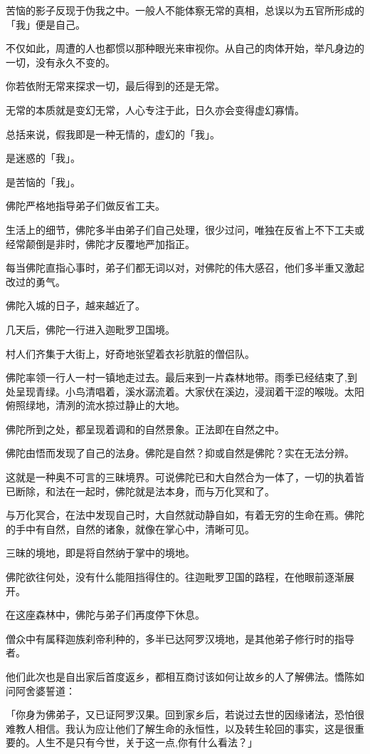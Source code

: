 \documentclass[twoside,openany]{book}
\begin{document}
苦恼的影子反现于伪我之中。一般人不能体察无常的真相，总误以为五官所形成的「我」便是自己。

不仅如此，周遭的人也都惯以那种眼光来审视你。从自己的肉体开始，举凡身边的一切，没有永久不变的。

你若依附无常来探求一切，最后得到的还是无常。

无常的本质就是变幻无常，人心专注于此，日久亦会变得虚幻寡情。

总括来说，假我即是一种无情的，虚幻的「我」。

是迷惑的「我」。

是苦恼的「我」。

佛陀严格地指导弟子们做反省工夫。

生活上的细节，佛陀多半由弟子们自己处理，很少过问，唯独在反省上不下工夫或经常颠倒是非时，佛陀才反覆地严加指正。

每当佛陀直指心事时，弟子们都无词以对，对佛陀的伟大感召，他们多半重又激起改过的勇气。

佛陀入城的日子，越来越近了。

几天后，佛陀一行进入迦毗罗卫国境。

村人们齐集于大街上，好奇地张望着衣衫肮脏的僧侣队。

佛陀率领一行人一村一镇地走过去。最后来到一片森林地带。雨季已经结束了,到处呈现青绿。小鸟清唱着，溪水潺流着。大家伏在溪边，浸润着干涩的喉咙。太阳俯照绿地，清洌的流水掠过静止的大地。

佛陀所到之处，都呈现着调和的自然景象。正法即在自然之中。

佛陀由悟而发现了自己的法身。佛陀是自然？抑或自然是佛陀？实在无法分辨。

这就是一种奥不可言的三昧境界。可说佛陀已和大自然合为一体了，一切的执着皆已断除，和法在一起时，佛陀就是法本身，而与万化冥和了。

与万化冥合，在法中发现自己时，大自然就动静自如，有着无穷的生命在焉。佛陀的手中有自然，自然的诸象，就像在掌心中，清晰可见。

三昧的境地，即是将自然纳于掌中的境地。

佛陀欲往何处，没有什么能阻挡得住的。往迦毗罗卫国的路程，在他眼前逐渐展开。

在这座森林中，佛陀与弟子们再度停下休息。

僧众中有属释迦族刹帝利种的，多半已达阿罗汉境地，是其他弟子修行时的指导者。

他们此次也是自出家后首度返乡，都相互商讨该如何让故乡的人了解佛法。憍陈如问阿舍婆誓道：

「你身为佛弟子，又已证阿罗汉果。回到家乡后，若说过去世的因缘诸法，恐怕很难教人相信。我认为应让他们了解生命的永恒性，以及转生轮回的事实，这是很重要的。人生不是只有今世，关于这一点,你有什么看法？」
\end{document}
